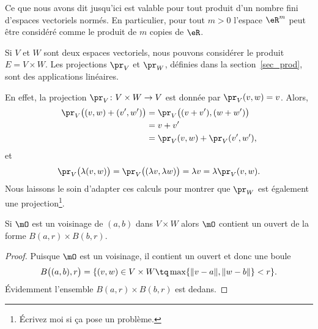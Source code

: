 Ce que nous avons dit jusqu'ici est valable pour tout produit d'un nombre fini d'espaces vectoriels normés. En particulier, pour tout $m>0$  l'espace  $\eR^m$ peut être considéré comme le produit de $m$ copies de $\eR$.

\begin{example}
    Si $V$ et $W$ sont deux espaces vectoriels, nous pouvons considérer le produit $E=V\times W$. Les projections $\pr_V$ et $\pr_W$, définies dans la section~\ref{sec_prod}, sont des applications linéaires.

    En effet, la projection $\pr_V\colon V\times W\to V$ est donnée par $\pr_V(v,w)=v$. Alors,
    \begin{equation}
        \begin{aligned}[]
            \pr_V\big( (v,w)+(v',w') \big)  & =\pr_V\big( (v+v'),(w+w') \big)   \\
                                            & =v+v'                             \\
                                            & =\pr_V(v,w)+\pr_V(v',w'),
        \end{aligned}
    \end{equation}
    et
    \begin{equation}
        \pr_V\big( \lambda(v,w) \big)=\pr_V\big( (\lambda v,\lambda w) \big)=\lambda v=\lambda\pr_V(v,w).
    \end{equation}
    Nous laissons  le soin d'adapter ces calculs pour montrer que \( \pr_W\) est également une projection\footnote{Écrivez moi si ça pose un problème.}.
\end{example}

\begin{proposition} \label{PropDXR_KbaLC}
    Si \( \mO\) est un voisinage de \( (a,b)\) dans \( V\times W\) alors \( \mO\) contient un ouvert de la forme \( B(a,r)\times B(b,r)\).
\end{proposition}

\begin{proof}
    Puisque \( \mO\) est un voisinage, il contient un ouvert et donc une boule
    \begin{equation}
        B\big( (a,b),r \big)=\{ (v,w)\in V\times W\tq \max\{ \| v-a \|,\| w-b \| \}< r \}.
    \end{equation}
    Évidemment l'ensemble \( B(a,r)\times B(b,r)\) est dedans.
\end{proof}

